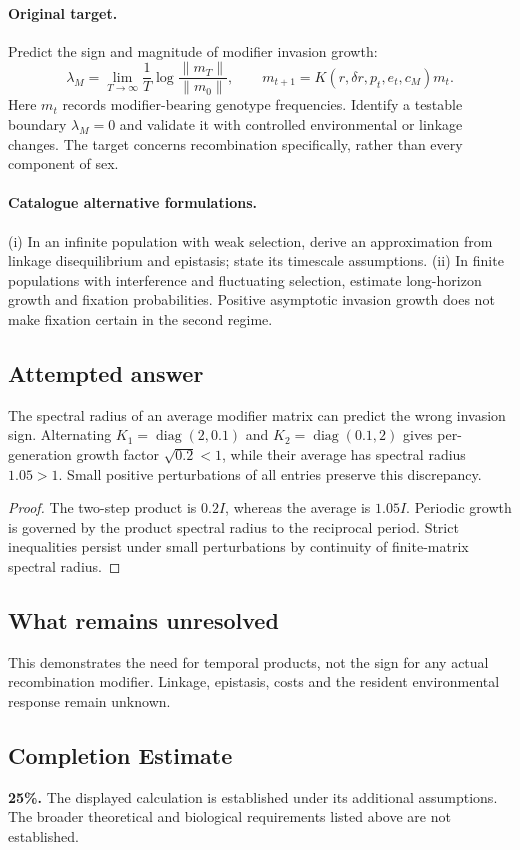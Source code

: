 \documentclass[11pt]{article}
\begin{document}
\paragraph{Original target.}
Predict the sign and magnitude of modifier invasion growth:
\[
\lambda_M=\lim_{T\to\infty}\frac1T\log\frac{\|m_T\|}{\|m_0\|},
\qquad
m_{t+1}=K(r,\delta r,p_t,e_t,c_M)m_t.
\]
Here $m_t$ records modifier-bearing genotype frequencies. Identify a testable boundary $\lambda_M=0$ and validate it with controlled environmental or linkage changes. The target concerns recombination specifically, rather than every component of sex.
\paragraph{Catalogue alternative formulations.}
(i) In an infinite population with weak selection, derive an approximation from linkage disequilibrium and epistasis; state its timescale assumptions. (ii) In finite populations with interference and fluctuating selection, estimate long-horizon growth and fixation probabilities. Positive asymptotic invasion growth does not make fixation certain in the second regime.
\subsection{Attempted answer}
\begin{proposition}
The spectral radius of an average modifier matrix can predict the wrong invasion sign. Alternating $K_1=\operatorname{diag}(2,0.1)$ and $K_2=\operatorname{diag}(0.1,2)$ gives per-generation growth factor $\sqrt{0.2}<1$, while their average has spectral radius $1.05>1$. Small positive perturbations of all entries preserve this discrepancy.
\end{proposition}
\begin{proof}
The two-step product is $0.2I$, whereas the average is $1.05I$. Periodic growth is governed by the product spectral radius to the reciprocal period. Strict inequalities persist under small perturbations by continuity of finite-matrix spectral radius.
\end{proof}
\subsection{What remains unresolved}
This demonstrates the need for temporal products, not the sign for any actual recombination modifier. Linkage, epistasis, costs and the resident environmental response remain unknown.
\subsection{Completion Estimate}
\textbf{25\%.} The displayed calculation is established under its additional assumptions. The broader theoretical and biological requirements listed above are not established.
\end{document}
